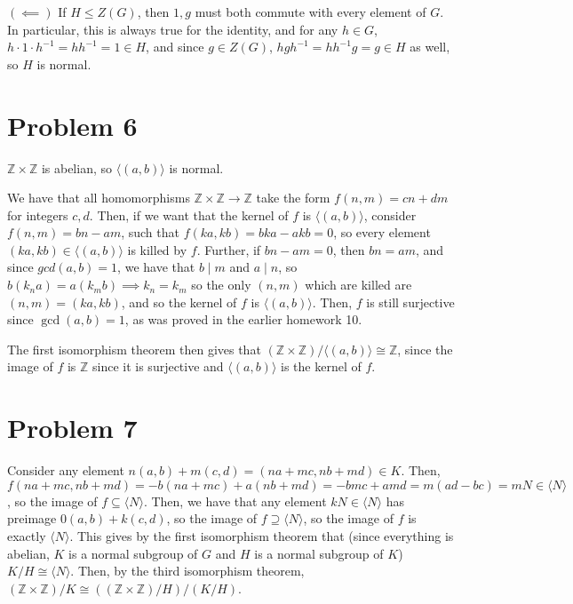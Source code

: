 \documentclass[12pt,letterpaper]{article}
\theoremstyle{definition}
\newcommand{\Z}{\mathbb{Z}}
\begin{document}
$(\impliedby)$ If $H \leq Z(G)$, then $1, g$ must both commute with every element of $G$. In particular, this is always true for the identity, and for any $h \in G$, $h \cdot 1 \cdot h^{-1} = hh^{-1} = 1 \in H$, and since $g \in Z(G)$, $hgh^{-1} = hh^{-1}g = g \in H$ as well, so $H$ is normal.

\section*{Problem 6}

$\Z \times \Z$ is abelian, so $\langle (a,b) \rangle$ is normal.

We have that all homomorphisms $\Z \times \Z \rightarrow \Z$ take the form $f(n,m) = cn + dm$ for integers $c,d$. Then, if we want that the kernel of $f$ is $\langle (a,b) \rangle$, consider $f(n,m) = bn - am$, such that $f(ka, kb) = bka - akb = 0$, so every element $(ka, kb) \in \langle (a,b) \rangle$ is killed by $f$. Further, if $bn - am = 0$, then $bn = am$, and since $gcd(a,b) = 1$, we have that $b \mid m$ and $a \mid n$, so $b(k_{n}a) = a(k_{m}b) \implies k_{n} = k_{m}$ so the only $(n,m)$ which are killed are $(n,m) = (ka, kb)$, and so the kernel of $f$ is $\langle (a,b) \rangle$. Then, $f$ is still surjective since $\gcd(a,b) = 1$, as was proved in the earlier homework 10.

The first isomorphism theorem then gives that $(\Z \times \Z) / \langle (a,b) \rangle \cong \Z$, since the image of $f$ is $\Z$ since it is surjective and $\langle (a,b) \rangle$ is the kernel of $f$.

\section*{Problem 7}

Consider any element $n(a,b) + m(c,d) = (na + mc, nb + md) \in K$. Then, $f(na + mc, nb + md) = -b(na + mc) + a(nb + md) = -bmc + amd = m(ad - bc) = mN \in \langle N \rangle$, so the image of $f \subseteq \langle N \rangle$. Then, we have that any element $kN \in \langle N \rangle$ has preimage $0(a,b) + k(c,d)$, so the image of $f \supseteq \langle N \rangle$, so the image of $f$ is exactly $\langle N \rangle$. This gives by the first isomorphism theorem that (since everything is abelian, $K$ is a normal subgroup of $G$ and $H$ is a normal subgroup of $K$) $K/H \cong \langle N \rangle$. Then, by the third isomorphism theorem, $(\Z \times \Z) / K \cong ((\Z \times \Z)/H) / (K/H)$.
\end{document}
